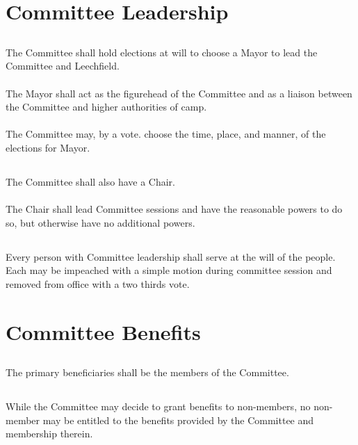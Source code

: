 \documentclass[6pt]{bill}
\begin{document}
	\section{Committee Leadership}{
		\subsection{}{
			The Committee shall hold elections at will to choose a Mayor to lead the Committee and Leechfield.
			\paragraph{}{
				The Mayor shall act as the figurehead of the Committee and as a liaison between the Committee and higher authorities of camp.
			}
			\paragraph{}{
				The Committee may, by a vote. choose the time, place, and manner, of the elections for Mayor.
			}
		}
		\subsection{}{
			The Committee shall also have a Chair.
			\paragraph{}{
				The Chair shall lead Committee sessions and have the reasonable powers to do so, but otherwise have no additional powers.
			}
		}
		\subsection{}{
			Every person with Committee leadership shall serve at the will of the people. Each may be impeached with a simple motion during committee session and removed from office with a two thirds vote.
		}
	}
	\section{Committee Benefits}{
		\subsection{}{
			The primary beneficiaries shall be the members of the Committee.
		}
		\subsection{}{
			While the Committee may decide to grant benefits to non-members, no non-member may be entitled to the benefits provided by the Committee and membership therein.
		}
	}
\end{document}
